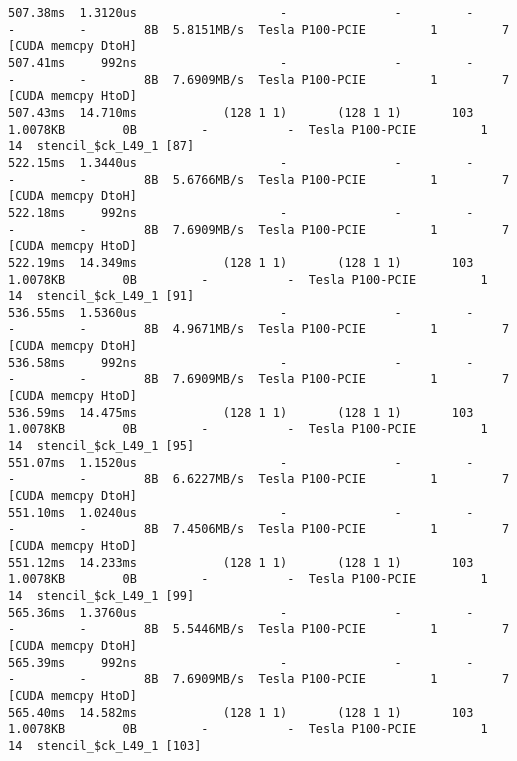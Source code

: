 \documentclass[aspectratio=169]{beamer}
\begin{document}
\begin{frame}[fragile]
\begin{verbatim}
507.38ms  1.3120us                    -               -         -         -         -        8B  5.8151MB/s  Tesla P100-PCIE         1         7  [CUDA memcpy DtoH]
507.41ms     992ns                    -               -         -         -         -        8B  7.6909MB/s  Tesla P100-PCIE         1         7  [CUDA memcpy HtoD]
507.43ms  14.710ms            (128 1 1)       (128 1 1)       103  1.0078KB        0B         -           -  Tesla P100-PCIE         1        14  stencil_$ck_L49_1 [87] 
522.15ms  1.3440us                    -               -         -         -         -        8B  5.6766MB/s  Tesla P100-PCIE         1         7  [CUDA memcpy DtoH]
522.18ms     992ns                    -               -         -         -         -        8B  7.6909MB/s  Tesla P100-PCIE         1         7  [CUDA memcpy HtoD]        
522.19ms  14.349ms            (128 1 1)       (128 1 1)       103  1.0078KB        0B         -           -  Tesla P100-PCIE         1        14  stencil_$ck_L49_1 [91] 
536.55ms  1.5360us                    -               -         -         -         -        8B  4.9671MB/s  Tesla P100-PCIE         1         7  [CUDA memcpy DtoH]
536.58ms     992ns                    -               -         -         -         -        8B  7.6909MB/s  Tesla P100-PCIE         1         7  [CUDA memcpy HtoD]
536.59ms  14.475ms            (128 1 1)       (128 1 1)       103  1.0078KB        0B         -           -  Tesla P100-PCIE         1        14  stencil_$ck_L49_1 [95]
551.07ms  1.1520us                    -               -         -         -         -        8B  6.6227MB/s  Tesla P100-PCIE         1         7  [CUDA memcpy DtoH]
551.10ms  1.0240us                    -               -         -         -         -        8B  7.4506MB/s  Tesla P100-PCIE         1         7  [CUDA memcpy HtoD]
551.12ms  14.233ms            (128 1 1)       (128 1 1)       103  1.0078KB        0B         -           -  Tesla P100-PCIE         1        14  stencil_$ck_L49_1 [99]
565.36ms  1.3760us                    -               -         -         -         -        8B  5.5446MB/s  Tesla P100-PCIE         1         7  [CUDA memcpy DtoH]
565.39ms     992ns                    -               -         -         -         -        8B  7.6909MB/s  Tesla P100-PCIE         1         7  [CUDA memcpy HtoD]
565.40ms  14.582ms            (128 1 1)       (128 1 1)       103  1.0078KB        0B         -           -  Tesla P100-PCIE         1        14  stencil_$ck_L49_1 [103]


\end{verbatim}
\end{frame}
\end{document}
